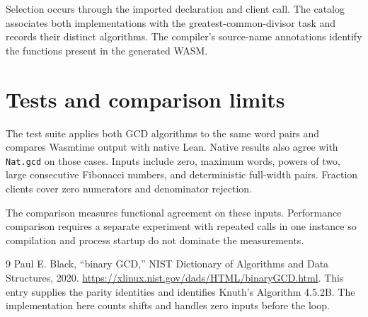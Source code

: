 Selection occurs through the imported declaration and client call.  The
catalog associates both implementations with the greatest-common-divisor task
and records their distinct algorithms.  The compiler's source-name annotations
identify the functions present in the generated WASM.

\section{Tests and comparison limits}
The test suite applies both GCD algorithms to the same word pairs and compares
Wasmtime output with native Lean.  Native results also agree with
\texttt{Nat.gcd} on those cases.  Inputs include zero, maximum words, powers
of two, large consecutive Fibonacci numbers, and deterministic full-width
pairs.  Fraction clients cover zero numerators and denominator rejection.

The comparison measures functional agreement on these inputs.  Performance
comparison requires a separate experiment with repeated calls in one instance
so compilation and process startup do not dominate the measurements.

\begin{thebibliography}{9}
 Paul E. Black, ``binary GCD,'' NIST Dictionary of Algorithms
and Data Structures, 2020.
\url{https://xlinux.nist.gov/dads/HTML/binaryGCD.html}.
This entry supplies the parity identities and identifies Knuth's Algorithm
4.5.2B.  The implementation here counts shifts and handles zero inputs before
the loop.
\end{thebibliography}

